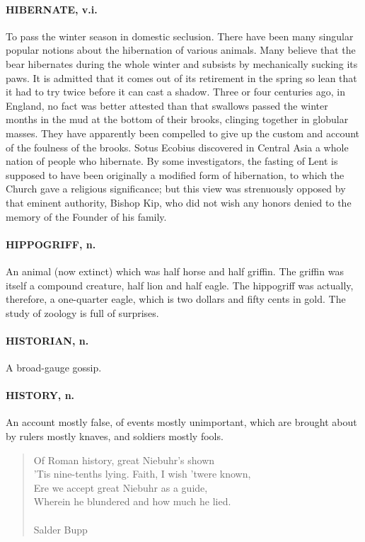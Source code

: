 \documentclass[11pt]{article}
\begin{document}
\paragraph{HIBERNATE, v.i.}  To pass the winter season in domestic seclusion.
There have been many singular popular notions about the hibernation of
various animals.  Many believe that the bear hibernates during the
whole winter and subsists by mechanically sucking its paws.  It is
admitted that it comes out of its retirement in the spring so lean
that it had to try twice before it can cast a shadow.  Three or four
centuries ago, in England, no fact was better attested than that
swallows passed the winter months in the mud at the bottom of their
brooks, clinging together in globular masses.  They have apparently
been compelled to give up the custom and account of the foulness of
the brooks.  Sotus Ecobius discovered in Central Asia a whole nation
of people who hibernate.  By some investigators, the fasting of Lent
is supposed to have been originally a modified form of hibernation, to
which the Church gave a religious significance; but this view was
strenuously opposed by that eminent authority, Bishop Kip, who did not
wish any honors denied to the memory of the Founder of his family.

\paragraph{HIPPOGRIFF, n.}  An animal (now extinct) which was half horse and half
griffin.  The griffin was itself a compound creature, half lion and
half eagle.  The hippogriff was actually, therefore, a one-quarter
eagle, which is two dollars and fifty cents in gold.  The study of
zoology is full of surprises.

\paragraph{HISTORIAN, n.}  A broad-gauge gossip.

\paragraph{HISTORY, n.}  An account mostly false, of events mostly unimportant,
which are brought about by rulers mostly knaves, and soldiers mostly
fools.

\begin{quote}   Of Roman history, great Niebuhr's shown \\
  'Tis nine-tenths lying.  Faith, I wish 'twere known, \\
  Ere we accept great Niebuhr as a guide, \\
  Wherein he blundered and how much he lied. \\
 \\
Salder Bupp \end{quote}
\end{document}
